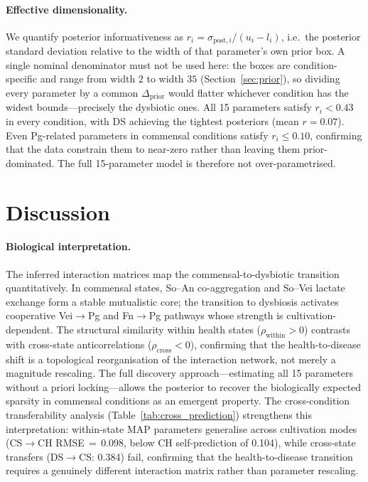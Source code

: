 \documentclass[11pt,a4paper]{article}
\begin{document}
\paragraph{Effective dimensionality.}
We quantify posterior informativeness as $r_i = \sigma_{\mathrm{post},i} / (u_i-l_i)$, i.e.\ the posterior standard deviation relative to the width of that parameter's own prior box.
A single nominal denominator must not be used here: the boxes are condition-specific and range from width $2$ to width $35$ (Section~\ref{sec:prior}), so dividing every parameter by a common $\Delta_{\mathrm{prior}}$ would flatter whichever condition has the widest bounds---precisely the dysbiotic ones.
All 15 parameters satisfy $r_i < 0.43$ in every condition, with DS achieving the tightest posteriors (mean $r=0.07$).
Even Pg-related parameters in commensal conditions satisfy $r_i \leq 0.10$, confirming that the data constrain them to near-zero rather than leaving them prior-dominated.
The full 15-parameter model is therefore not over-parametrised.

\section{Discussion}
\label{sec:discussion}

\paragraph{Biological interpretation.}
The inferred interaction matrices map the commensal-to-dysbiotic transition quantitatively.
In commensal states, So--An co-aggregation and So--Vei lactate exchange form a stable mutualistic core; the transition to dysbiosis activates cooperative Vei$\to$Pg and Fn$\to$Pg pathways whose strength is cultivation-dependent.
The structural similarity within health states ($\rho_{\text{within}}>0$) contrasts with cross-state anticorrelations ($\rho_{\text{cross}}<0$), confirming that the health-to-disease shift is a topological reorganisation of the interaction network, not merely a magnitude rescaling.
The full discovery approach---estimating all 15 parameters without a priori locking---allows the posterior to recover the biologically expected sparsity in commensal conditions as an emergent property.
The cross-condition transferability analysis (Table~\ref{tab:cross_prediction}) strengthens this interpretation: within-state MAP parameters generalise across cultivation modes (CS$\to$CH RMSE\,$=$\,0.098, below CH self-prediction of 0.104), while cross-state transfers (DS$\to$CS: 0.384) fail, confirming that the health-to-disease transition requires a genuinely different interaction matrix rather than parameter rescaling.
\end{document}
